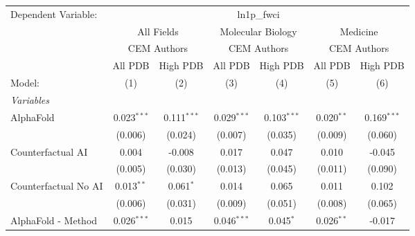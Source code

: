 \begingroup
\centering
\begin{tabular}{lcccccc}
   \tabularnewline \midrule \midrule
   Dependent Variable: & \multicolumn{6}{c}{ln1p\_fwci}\\
 & \multicolumn{2}{c}{All Fields} & \multicolumn{2}{c}{Molecular Biology} & \multicolumn{2}{c}{Medicine} \\
\cmidrule(lr){2-3} \cmidrule(lr){4-5} \cmidrule(lr){6-7}
 & \multicolumn{2}{c}{CEM Authors} & \multicolumn{2}{c}{CEM Authors} & \multicolumn{2}{c}{CEM Authors} \\
\cmidrule(lr){2-3} \cmidrule(lr){4-5} \cmidrule(lr){6-7}
 & \multicolumn{1}{c}{All PDB} & \multicolumn{1}{c}{High PDB} & \multicolumn{1}{c}{All PDB} & \multicolumn{1}{c}{High PDB} & \multicolumn{1}{c}{All PDB} & \multicolumn{1}{c}{High PDB} \\
\cmidrule(lr){2-2} \cmidrule(lr){3-3} \cmidrule(lr){4-4} \cmidrule(lr){5-5} \cmidrule(lr){6-6} \cmidrule(lr){7-7}
   Model:                                                     & (1)            & (2)           & (3)            & (4)           & (5)            & (6)\\  
   \midrule
   \emph{Variables}\\
   AlphaFold                                                  & 0.023$^{***}$  & 0.111$^{***}$ & 0.029$^{***}$  & 0.103$^{***}$ & 0.020$^{**}$   & 0.169$^{***}$\\   
                                                              & (0.006)        & (0.024)       & (0.007)        & (0.035)       & (0.009)        & (0.060)\\   
   Counterfactual AI                                          & 0.004          & -0.008        & 0.017          & 0.047         & 0.010          & -0.045\\   
                                                              & (0.005)        & (0.030)       & (0.013)        & (0.045)       & (0.011)        & (0.090)\\   
   Counterfactual No AI                                       & 0.013$^{**}$   & 0.061$^{*}$   & 0.014          & 0.065         & 0.011          & 0.102\\   
                                                              & (0.006)        & (0.031)       & (0.009)        & (0.051)       & (0.008)        & (0.065)\\   
   AlphaFold - Method                                         & 0.026$^{***}$  & 0.015         & 0.046$^{***}$  & 0.045$^{*}$   & 0.026$^{**}$   & -0.017\\   

\end{tabular}
